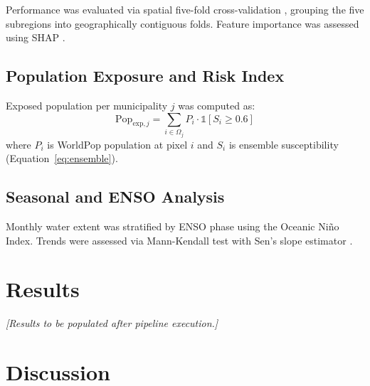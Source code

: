 \documentclass{article}
\begin{document}
Performance was evaluated via spatial five-fold cross-validation \citep{Roberts2017}, grouping the five subregions into geographically contiguous folds. Feature importance was assessed using SHAP \citep{Lundberg2017}.

\subsection{Population Exposure and Risk Index}

Exposed population per municipality $j$ was computed as:
\begin{equation}
    \text{Pop}_{\text{exp},j} = \sum_{i \in \Omega_j} P_i \cdot \mathbb{1}[S_i \geq 0.6]
    \label{eq:pop_exposure}
\end{equation}
where $P_i$ is WorldPop population at pixel $i$ and $S_i$ is ensemble susceptibility (Equation~\ref{eq:ensemble}).

\subsection{Seasonal and ENSO Analysis}

Monthly water extent was stratified by ENSO phase using the Oceanic Ni\~no Index. Trends were assessed via Mann-Kendall test \citep{Mann1945} with Sen's slope estimator \citep{Sen1968}.

\section{Results}
\label{sec:results}


\textit{[Results to be populated after pipeline execution.]}

\section{Discussion}
\label{sec:discussion}

\end{document}
